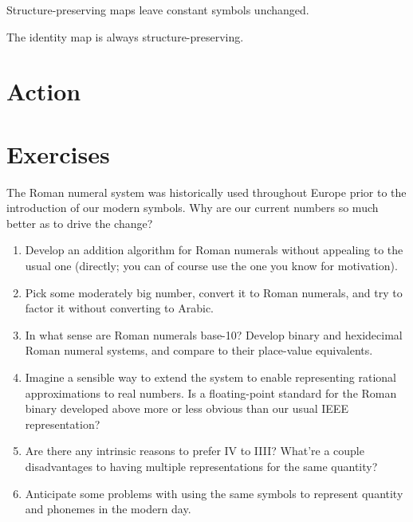 \begin{thm}
  Structure-preserving maps leave constant symbols unchanged.
\end{thm}

\begin{thm}
  The identity map is always structure-preserving.
\end{thm}

\begin{philosophy}
  \label{phil:nothing}
\end{philosophy}

\section{Action}


\section{Exercises}

\begin{prob}
  The Roman numeral system was historically used throughout Europe prior to the introduction of our modern symbols.
  Why are our current numbers so much better as to drive the change?
  \begin{enumerate}
  \item Develop an addition algorithm for Roman numerals without appealing to the usual one
    (directly; you can of course use the one you know for motivation).
  \item Pick some moderately big number, convert it to Roman numerals, and try to factor it without converting to Arabic.
  \item In what sense are Roman numerals base-10?
    Develop binary and hexidecimal Roman numeral systems, and compare to their place-value equivalents.
  \item Imagine a sensible way to extend the system to enable representing rational approximations to real numbers.
    Is a floating-point standard for the Roman binary developed above more or less obvious than our usual IEEE representation?
  \item Are there any intrinsic reasons to prefer IV to IIII?
    What're a couple disadvantages to having multiple representations for the same quantity?
  \item Anticipate some problems with using the same symbols to represent quantity and phonemes in the modern day.
  \end{enumerate}
\end{prob}

